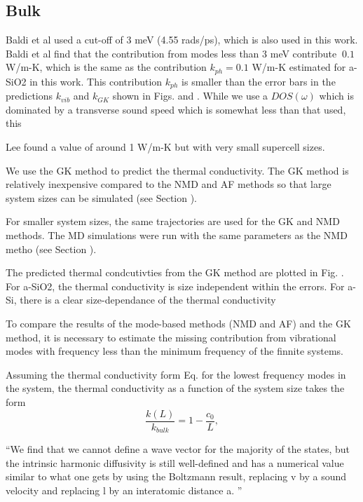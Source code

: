 \documentclass[aps,prb,twocolumn,superscriptaddress,footinbib,amsmath,amssymb,floatfix]{revtex4}
\begin{document}
\subsection{\label{S:Bulk}Bulk}

Baldi et al used a cut-off of 3 meV (4.55 rads/ps), which is also 
used in this work.\cite{baldi_thermal_2008} 
Baldi et al find that the contribution from modes less than 3 meV 
contribute $~0.1$ W/m-K, which is the same as the contribution 
$k_{ph} = 0.1$ W/m-K estimated for a-SiO2 in this work. This contribution 
$k_{ph}$ is smaller than the error bars in the predictions $k_{vib}$ and 
$k_{GK}$ shown in Figs. and . While we use a $DOS(\omega)$ which is 
dominated by a transverse sound speed which is somewhat less than that 
used, this 

Lee found a value of around 1 W/m-K 
but with very small supercell sizes.\cite{lee_molecular-dynamics_1991}

We use the GK method to predict the thermal conductivity. The GK method 
is relatively inexpensive compared to the NMD and AF methods so that 
large system sizes 
can be simulated (see Section ).  

For smaller system sizes, the same trajectories are used for the GK and 
NMD methods. The MD simulations were run with the same parameters 
as the NMD metho (see Section ). 

The predicted thermal condcutivties from the GK method are plotted 
in Fig. . For a-SiO2, the thermal conductivity is size independent 
within the errors.  For a-Si, there is a clear size-dependance of the 
thermal conductivity

To compare the results of the mode-based methods (NMD and AF) and 
the GK method, it is necessary to estimate the missing contribution from 
vibrational modes with frequency less than the minimum frequency of 
the finnite systems. 

Assuming the thermal conductivity form Eq.  for the lowest frequency modes in 
the system, the thermal conductivity as a function of the system size 
takes the form
\begin{equation}\label{EQ:k0}
\frac{k(L)}{k_{bulk}} = 1 - \frac{c_0}{L},
\end{equation}

``We find that we cannot define a wave vector for the
majority of the states, but the intrinsic harmonic diffusivity is still well-defined and has a numerical value
similar to what one gets by using the Boltzmann result, replacing v by a sound velocity and replacing l by
an interatomic distance a.
''\cite{feldman_thermal_1993}
\end{document}
